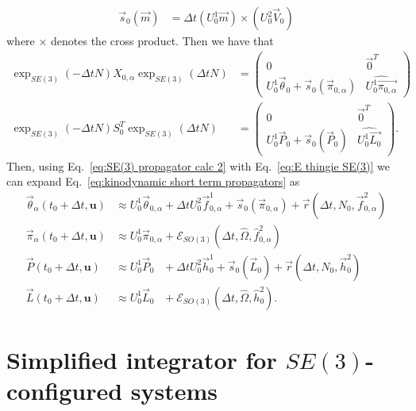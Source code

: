 \documentclass[withindex,glossary,techreport]{cam-thesis}
\begin{document}
\begin{appendices}
\begin{subequations}
\begin{align}
		\vec{s}_0(\vec{m}) & = \Delta t (U^1_0 \vec{m}) \times \left( U_0^2 \vec{V}_0 \right)
	\end{align}
\end{subequations}
where $\times$ denotes the cross product. Then we have that
\begin{subequations} \label{eq:SE(3) propagator calc 2}
\begin{align}
	\exp_{SE(3)}(-\Delta t N) X_{0,\alpha} \exp_{SE(3)}(\Delta t N) & = \begin{pmatrix}
		0 & \vec{0}^T \\
		U_0^1 \vec{\theta}_0 + \vec{s}_0(\vec{\pi}_{0,\alpha}) & \widehat{ U_0^1 \vec{\pi_{0,\alpha}} }
	\end{pmatrix} \\
	\exp_{SE(3)}(-\Delta t N) S_0^T \exp_{SE(3)}(\Delta t N) & = \begin{pmatrix}
		0 & \vec{0}^T \\
		U_0^1 \vec{P}_0 + \vec{s}_0(\vec{P}_0) & \widehat{ U_0^1 \vec{L_0} }	
	\end{pmatrix}.
\end{align}
\end{subequations}
Then, using Eq.~\ref{eq:SE(3) propagator calc 2} with Eq.~\ref{eq:E thingie SE(3)} we can expand Eq.~\ref{eq:kinodynamic short term propagators} as
\begin{subequations}
	\begin{align}
	\vec{\theta}_\alpha(t_0 + \Delta t, \mathbf{u}) & \approx U_0^1 \vec{\theta}_{0,\alpha} + \Delta t U_0^2 \vec{f}_{0,\alpha}^1 + \vec{s}_0(\vec{\pi}_{0,\alpha}) + \vec{r}(\Delta t, N_0, \vec{f}_{0,\alpha}^2) \\
	\vec{\pi}_\alpha(t_0 + \Delta t, \mathbf{u}) & \approx U_0^1 \vec{\pi}_{0,\alpha} + \mathscr{E}_{SO(3)}(\Delta t, \hat{\Omega}, \hat{f}_{0,\alpha}^2) \\
	\vec{P}(t_0 + \Delta t, \mathbf{u}) & \approx U_0^1 \vec{P}_{0\phantom{,\alpha}} + \Delta t U_0^2 \vec{h}_0^1 + \vec{s}_0(\vec{L}_0) + \vec{r}(\Delta t, N_0, \vec{h}_0^2) \\
	\vec{L}(t_0 + \Delta t, \mathbf{u}) & \approx U_0^1 \vec{L}_{0\phantom{,\alpha}} + \mathscr{E}_{SO(3)}(\Delta t, \hat{\Omega}, \hat{h}_0^2).
	\end{align}
\end{subequations} 

\section{Simplified integrator for $SE(3)$-configured systems} \label{app:Simplified integrator for SE(3)-configured systems}


\end{appendices}
\end{document}
